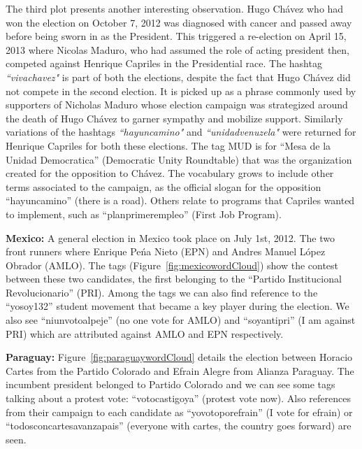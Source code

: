 The third plot presents another interesting observation.
Hugo Ch\'{a}vez who had won the election on October 7, 2012 was diagnosed with cancer and passed away
before being sworn in as the President.
This triggered a re-election on April 15, 2013 where Nicolas Maduro, who had assumed the role of acting president then, competed 
against Henrique Capriles in the Presidential race.
The hashtag \emph{``vivachavez"} is part of both the elections, despite the 
fact that Hugo Ch\'{a}vez did not compete in the second election.
It is picked up as a phrase commonly used by supporters of Nicholas Maduro whose election campaign was strategized around the death of Hugo Ch\'{a}vez to garner sympathy and mobilize support.
Similarly variations of the hashtags \emph{``hayuncamino"} and \emph{``unidadvenuzela"} were returned 
for Henrique Capriles for both these elections.
The tag MUD is for ``Mesa de la Unidad Democratica” (Democratic Unity Roundtable) that was the organization created for the opposition to Ch\'{a}vez. 
The vocabulary grows to include other terms associated to the campaign, as the official slogan for the opposition ``hayuncamino” (there is a road). 
Others relate to programs that Capriles wanted to implement, such as ``planprimerempleo” (First Job Program). 

\noindent	
{\bf Mexico:} A general election in Mexico took place on July 1st, 2012.
The two front runners where Enrique Pe\'{n}a Nieto (EPN) and Andres Manuel L\'{o}pez Obrador (AMLO).
The tags (Figure~\ref{fig:mexicowordCloud}) show the contest between these two candidates, the first belonging to the “Partido Institucional Revolucionario” (PRI). 
Among the tags we can also find reference to the “yosoy132” student movement that became a key player during the election. 
We also see “niunvotoalpeje” (no one vote for AMLO) and “soyantipri” (I am against PRI) which are attributed against AMLO and EPN respectively.

\noindent
{\bf Paraguay:}
Figure~\ref{fig:paraguaywordCloud} details the election between Horacio Cartes from the Partido Colorado and Efrain Alegre from Alianza Paraguay. 
The incumbent president belonged to Partido Colorado and we can see some tags talking about a protest vote: “votocastigoya” (protest vote now). 
Also references from their campaign to each candidate as “yovotoporefrain” (I vote for efrain) or “todosconcartesavanzapais” (everyone with cartes, the country goes forward) are seen.

